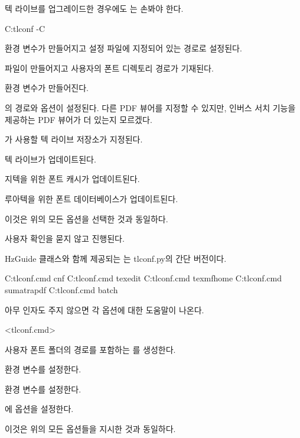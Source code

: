 텍 라이브를 업그레이드한 경우에도 는 손봐야 한다.

\begin{code}
C:\>tlconf -C 
\end{code}

\begin{macros}
\item[-H]  환경 변수가 만들어지고 설정 파일에 지정되어 있는 경로로 설정된다.
\item[-L]  파일이 만들어지고 사용자의 폰트 디렉토리 경로가 기재된다.
\item[-e]  환경 변수가 만들어진다.
\item[-p] 의 경로와  옵션이 설정된다. 다른 PDF 뷰어를 지정할 수 있지만, 인버스 서치 기능을 제공하는 PDF 뷰어가 더 있는지 모르겠다.
\item[-r] 가 사용할 텍 라이브 저장소가 지정된다.
\item[-u] 텍 라이브가 업데이트된다.
\item[-c] 지텍을 위한 폰트 캐시가 업데이트된다.
\item[-l] 루아텍을 위한 폰트 데이터베이스가 업데이트된다.
\item[-b] 이것은 위의 모든 옵션을 선택한 것과 동일하다.
\item[-q] 사용자 확인을 묻지 않고 진행된다.
\end{macros}

HzGuide 클래스와 함께 제공되는 는 tlconf.py의 간단 버전이다.

\begin{codewrite}
C:\>tlconf.cmd cnf
C:\>tlconf.cmd texedit
C:\>tlconf.cmd texmfhome
C:\>tlconf.cmd sumatrapdf
C:\>tlconf.cmd batch
\end{codewrite}
\powershellread

아무 인자도 주지 않으면 각 옵션에 대한 도움말이 나온다.

\begin{macros}<tlconf.cmd>
\item[cnf] 사용자 폰트 폴더의 경로를 포함하는 를 생성한다.
\item[texedit]  환경 변수를 설정한다.
\item[texmfhome]  환경 변수를 설정한다.
\item[sumatrapdf] 에  옵션을 설정한다.
\item[batch] 이것은 위의 모든 옵션들을 지시한 것과 동일하다.
\end{macros}

